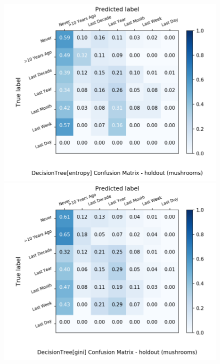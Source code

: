 \begin{figure}[H]
	\centering
	\begin{minipage}[b]{0.32\textwidth}
		\includegraphics[width=1.1\textwidth]{Plots/mushrooms_DecisionTree_entropy_balance_False_holdout.png}
	\end{minipage}
	\begin{minipage}[b]{0.32\textwidth}
		\includegraphics[width=1.1\textwidth]{Plots/mushrooms_DecisionTree_gini_balance_False_holdout.png}
	\end{minipage}
	\begin{minipage}[b]{0.32\textwidth}

\end{minipage}
\end{figure}
